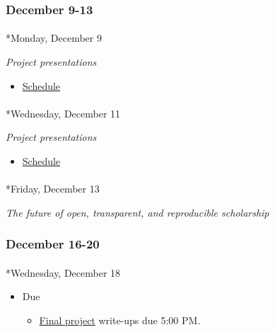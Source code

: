 \documentclass[
  letterpaper,
  DIV=11,
  numbers=noendperiod]{scrartcl}
\makeatletter
\let\oldparagraph\paragraph
\renewcommand{\paragraph}{
    \@ifstar
      \xxxParagraphStar
      \xxxParagraphNoStar
  }
\newcommand{\xxxParagraphStar}[1]{\oldparagraph*{#1}\mbox{}}
\newcommand{\xxxParagraphNoStar}[1]{\oldparagraph{#1}\mbox{}}
\providecommand{\tightlist}{%
  \setlength{\itemsep}{0pt}\setlength{\parskip}{0pt}}\usepackage{longtable,booktabs,array}
\makeatother
\begin{document}
\subsubsection*{December 9-13}\label{week-15}

\paragraph*{Monday, December 9}\label{monday-december-9}

\emph{Project presentations}

\begin{itemize}
\tightlist
\item
  \href{}{Schedule}
\end{itemize}

\paragraph*{Wednesday, December 11}\label{wednesday-december-11}

\emph{Project presentations}

\begin{itemize}
\tightlist
\item
  \href{}{Schedule}
\end{itemize}

\paragraph*{Friday, December 13}\label{friday-december-13}

\emph{The future of open, transparent, and reproducible scholarship}

\subsubsection*{December 16-20}\label{finals-week}

\paragraph*{Wednesday, December 18}\label{wednesday-december-18}

\begin{itemize}
\tightlist
\item
  {Due}

  \begin{itemize}
  \tightlist
  \item
    \href{exercises/final-project.qmd}{Final project} write-ups due 5:00
    PM.
  \end{itemize}
\end{itemize}
\end{document}
